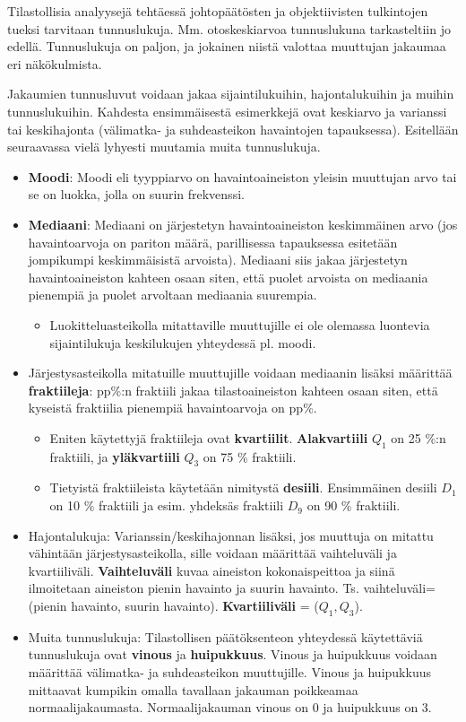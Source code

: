 \documentclass[
]{book}
\providecommand{\tightlist}{%
  \setlength{\itemsep}{0pt}\setlength{\parskip}{0pt}}
\begin{document}
Tilastollisia analyysejä tehtäessä johtopäätösten ja objektiivisten tulkintojen tueksi tarvitaan tunnuslukuja. Mm. otoskeskiarvoa tunnuslukuna tarkasteltiin jo edellä. Tunnuslukuja on paljon, ja jokainen niistä valottaa muuttujan jakaumaa eri näkökulmista.

Jakaumien tunnusluvut voidaan jakaa sijaintilukuihin, hajontalukuihin ja muihin tunnuslukuihin. Kahdesta ensimmäisestä esimerkkejä ovat keskiarvo ja varianssi tai keskihajonta (välimatka- ja suhdeasteikon havaintojen tapauksessa). Esitellään seuraavassa vielä lyhyesti muutamia muita tunnuslukuja.

\begin{itemize}
\item
  \textbf{Moodi}: Moodi eli tyyppiarvo on havaintoaineiston yleisin muuttujan arvo tai se on luokka, jolla on suurin frekvenssi.
\item
  \textbf{Mediaani}: Mediaani on järjestetyn havaintoaineiston keskimmäinen arvo (jos havaintoarvoja on pariton määrä, parillisessa tapauksessa esitetään jompikumpi keskimmäisistä arvoista). Mediaani siis jakaa järjestetyn havaintoaineiston kahteen osaan siten, että puolet arvoista on mediaania pienempiä ja puolet arvoltaan mediaania suurempia.

  \begin{itemize}
  \tightlist
  \item
    Luokitteluasteikolla mitattaville muuttujille ei ole olemassa luontevia sijaintilukuja keskilukujen yhteydessä pl. moodi.
  \end{itemize}
\item
  Järjestysasteikolla mitatuille muuttujille voidaan mediaanin lisäksi määrittää \textbf{fraktiileja}: pp\%:n fraktiili jakaa tilastoaineiston kahteen osaan siten, että kyseistä fraktiilia pienempiä havaintoarvoja on pp\%.

  \begin{itemize}
  \tightlist
  \item
    Eniten käytettyjä fraktiileja ovat \textbf{kvartiilit}. \textbf{Alakvartiili} \(Q_1\) on 25 \%:n fraktiili, ja \textbf{yläkvartiili} \(Q_3\) on 75 \% fraktiili.
  \item
    Tietyistä fraktiileista käytetään nimitystä \textbf{desiili}. Ensimmäinen desiili \(D_1\) on 10 \% fraktiili ja esim. yhdeksäs fraktiili \(D_9\) on 90 \% fraktiili.
  \end{itemize}
\item
  Hajontalukuja: Varianssin/keskihajonnan lisäksi, jos muuttuja on mitattu vähintään järjestysasteikolla, sille voidaan määrittää vaihteluväli ja kvartiiliväli. \textbf{Vaihteluväli} kuvaa aineiston kokonaispeittoa ja siinä ilmoitetaan aineiston pienin havainto ja suurin havainto. Ts. vaihteluväli=(pienin havainto, suurin havainto). \textbf{Kvartiiliväli} = (\(Q_1, Q_3\)).
\item
  Muita tunnuslukuja: Tilastollisen päätöksenteon yhteydessä käytettäviä tunnuslukuja ovat \textbf{vinous} ja \textbf{huipukkuus}. Vinous ja huipukkuus voidaan määrittää välimatka- ja suhdeasteikon muuttujille. Vinous ja huipukkuus mittaavat kumpikin omalla tavallaan jakauman poikkeamaa normaalijakaumasta. Normaalijakauman vinous on 0 ja huipukkuus on 3.
\end{itemize}
\end{document}
